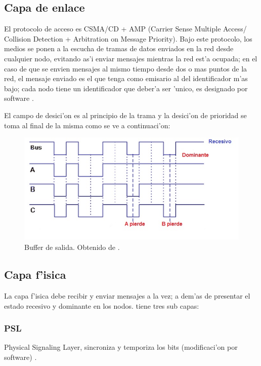 

\subsection{Capa de enlace}
El protocolo de acceso es CSMA/CD + AMP (Carrier Sense Multiple
Access/ Collision Detection + Arbitration on Message Priority). Bajo este protocolo, los medios se ponen a la escucha de tramas de datos enviados en la red desde cualquier nodo, evitando as'i enviar mensajes mientras la red est'a ocupada; en el caso de que se envien mensajes al mismo tiempo desde dos o mas puntos de la red, el mensaje enviado es el que tenga como emisario al del identificador m'as bajo; cada nodo tiene un identificador que deber'a ser 'unico, es designado por software \citep{garcia}.


El campo de desici'on es al principio de la trama y la desici'on de prioridad se toma al final de la misma como se ve a continuaci'on:

\begin{figure}[ht]
	\centering
		\includegraphics[scale=0.6]{Canynodos}
	\caption{Buffer de salida. Obtenido de \citet{garcia}.}
	\label{fig:canynodos}
\end{figure}

\subsection{Capa f'isica}

La capa f'isica debe recibir y enviar mensajes a la vez; a dem'as de presentar el estado recesivo y dominante en los nodos. tiene tres sub capas:

\subsubsection{PSL}
Physical Signaling Layer, sincroniza y temporiza los bits (modificaci'on por software) \citep{garcia}.
